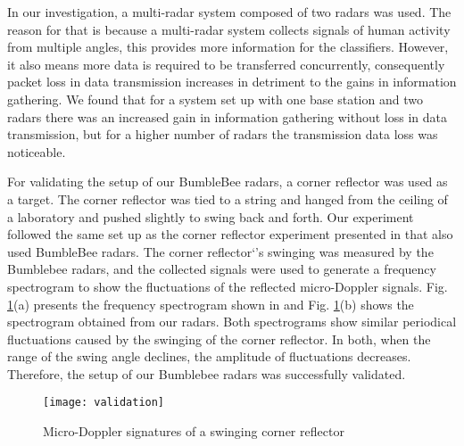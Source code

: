 In our investigation, a multi-radar system composed of two radars was used. The reason for that is because a multi-radar system collects signals of human activity from multiple angles, this provides more information for the classifiers. However, it also means more data is required to be transferred concurrently, consequently packet loss in data transmission increases in detriment to the gains in information gathering. We found that for a system set up with one base station and two radars there was an increased gain in information gathering without loss in data transmission, but for a higher number of radars the transmission data loss was noticeable.

For validating the setup of our BumbleBee radars, a corner reflector was used as a target. The corner reflector was tied to a string and hanged from the ceiling of a laboratory and pushed slightly to swing back and forth.  Our experiment followed the same set up as the corner reflector experiment presented in \cite{cagliyan2014human} that also used BumbleBee radars. The corner reflector`’s swinging was measured by the Bumblebee radars, and the collected signals were used to generate a frequency spectrogram to show the fluctuations of the reflected micro-Doppler signals. Fig. \ref{fig_validation}(a) presents the frequency spectrogram shown in \cite{cagliyan2014human} and Fig. \ref{fig_validation}(b) shows the spectrogram obtained from our radars. Both spectrograms show similar periodical fluctuations caused by the swinging of the corner reflector. In both, when the range of the swing angle declines, the amplitude of fluctuations decreases. Therefore, the setup of our Bumblebee radars was successfully validated.
\begin{figure}[!t]
\centering
\texttt{[image: validation]}
\centering
\caption{Micro-Doppler signatures of a swinging corner reflector}
\label{fig_validation}
\end{figure}

